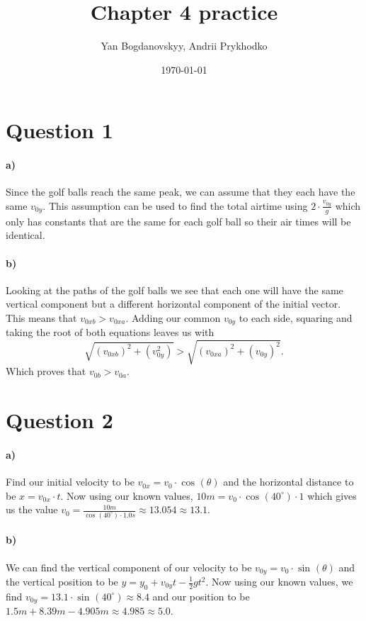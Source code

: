 \documentclass[a4paper]{article}
\title{Chapter 4 practice}
\author{Yan Bogdanovskyy, Andrii Prykhodko }
\date{\today}
\begin{document}
\maketitle
\section*{Question 1}%
\label{sec:Question 1}
\paragraph{a)} Since the golf balls reach the same peak, we can assume that they each have the same $ v_{ 0y } $. This assumption can be used to find the total airtime using $ 2 \cdot \frac{ v_{ 0y } }{ g } $ which only has constants that are the same for each golf ball so their air times will be identical. 
\paragraph{b)} Looking at the paths of the golf balls we see that each one will have the same vertical component but a different horizontal component of the initial vector. This means that $ v_{ 0xb } > v_{ 0xa } $. Adding our common $ v_{ 0y } $ to each side, squaring and taking the root of both equations leaves us with
\[
\sqrt{ \left( v_{ 0xb }\right) ^2 + \left(v_{ 0y }^2 \right) } > \sqrt{ \left( v_{ 0xa } \right) ^2 + \left( v_{ 0y } \right) ^2 } 
.\] 
Which proves that $ v_{ 0b }> v_{ 0a }$. 
\section*{Question 2}%
\label{sec:Question 2}
\paragraph{a)} Find our initial velocity to be $v_{ 0x }= v_0 \cdot \cos^{  } \left( \theta \right)  $ and the horizontal distance to be $ x=v_{ 0x }\cdot t $. Now using our known values, $ 10m = v_0 \cdot \cos^{  } \left( 40^{ \circ }\right) \cdot 1 $ which gives us the value $ v_0 = \frac{ 10m }{ \cos^{  } \left( 40^{ \circ } \right) \cdot 1.0s } \approx 13.054 \approx 13.1$.
\paragraph{b)} We can find the vertical component of our velocity to be $ v_{ 0y }= v_0 \cdot \sin^{  } \left( \theta \right)  $ and the vertical position to be $ y=y_0 + v_{ 0y }t - \frac{ 1 }{ 2 } gt^2 $. Now using our known values, we find $ v_{ 0y }= 13.1 \cdot \sin^{  } \left( 40^{ \circ } \right) \approx 8.4 $ and our position to be $ 1.5m + 8.39m - 4.905 m \approx 4.985 \approx 5.0$. 
\end{document}
